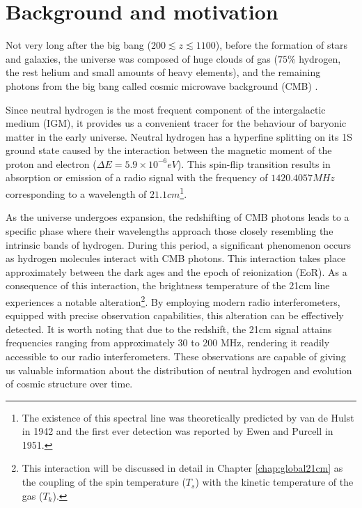 \documentclass[12pt, TexShade, letterpaper]{report}
\begin{document}
\section{Background and motivation}
Not very long after the big bang ($200 \lesssim z \lesssim 1100$), before the formation of stars and galaxies, the universe was composed of huge clouds of gas ($75\%$ hydrogen, the rest helium and small amounts of heavy elements\cite{21century}), and the remaining photons from the big bang called cosmic microwave background (CMB) \cite{map_universe}. \par
Since neutral hydrogen is the most frequent component of the intergalactic medium (IGM), it provides us a convenient tracer for the behaviour of baryonic matter in the early universe. Neutral hydrogen has a hyperfine splitting on its 1S ground state caused by the interaction between the magnetic moment of the proton and electron ($\Delta E = 5.9 \times 10 ^{-6}eV$\cite{21century}). This spin-flip transition results in absorption or emission of a radio signal with the frequency of $1420.4057MHz$\cite{low_frequency} corresponding to a wavelength of $21.1cm$\cite{21century}\footnote{The existence of this spectral line was theoretically predicted by van de Hulst in 1942 and the first ever detection was reported by Ewen and Purcell in 1951\cite{21century}.}.\par
As the universe undergoes expansion, the redshifting of CMB photons leads to a specific phase where their wavelengths approach those closely resembling the intrinsic bands of hydrogen. 
During this period, a significant phenomenon occurs as hydrogen molecules interact with CMB photons. This interaction takes place approximately between the dark ages and the epoch of reionization (EoR). As a consequence of this interaction, the brightness temperature of the 21cm line experiences a notable alteration\footnote{This interaction will be discussed in detail in Chapter \ref{chap:global21cm} as the coupling of the spin temperature ($T_s$) with the kinetic temperature of the gas ($T_k$).}. By employing modern radio interferometers, equipped with precise observation capabilities, this alteration can be effectively detected. It is worth noting that due to the redshift, the 21cm signal attains frequencies ranging from approximately 30 to 200 MHz, rendering it readily accessible to our radio interferometers\cite{low_frequency}.
These observations are capable of giving us valuable information about the distribution of neutral hydrogen and evolution of cosmic structure over time\cite{low_frequency}.\par
\end{document}
